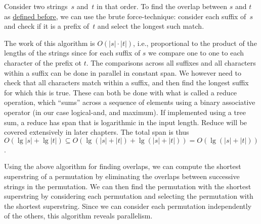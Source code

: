 \begin{cluster}
\label{grp:alg:genome::finding-overlap}

\begin{algorithm}
\label{alg:genome::finding-overlap}
Consider two strings~$s$ and~$t$ in that order.
To find the overlap between $s$ and $t$ as
\href{def:genome::prob::overlap}{defined before},
 we can use the brute force-technique:
consider each suffix of~$s$ and check if it is a prefix of~$t$ and
select the longest such match.


The work of this algorithm is $O(|s| \cdot |t|)$, i.e., proportional to the product of
the lengths of the strings since for each suffix of $s$ we compare one to
one to each character of the prefix ot $t$.
The comparisons across all suffixes and all characters within a suffix can be done in parallel
in constant span.
We however need to check that all characters match within a suffix, and then find the longest suffix for
which this is true.    These can both be done with what is called a reduce operation, which 
``sums'' across a sequence of elements using a binary associative operator (in our case logical-and, and maximum).
If implemented using a tree sum, a reduce has span that is logarithmic in the input length.   Reduce will be covered
extensively in later chapters.
The total span is thus $O(\lg{|s|} + \lg{|t|}) \subseteq
O(\lg{(|s|+|t|)} + \lg{(|s|+|t|)}) = O(\lg{(|s|+|t|)})$.

\end{algorithm}
\end{cluster}

\begin{cluster}
\label{grp:alg:genome::finding-the-shortest-permutation}

\begin{algorithm}
\label{alg:genome::finding-the-shortest-permutation}
Using the above algorithm for finding overlaps, we can compute the
shortest superstring of a permutation by eliminating the overlaps
between successive strings in the permutation.
We can then find the permutation with the shortest superstring by
considering each permutation and selecting the permutation with the
shortest superstring.
Since we can consider each permutation independently of the others,
this algorithm reveals parallelism.

\end{algorithm}
\end{cluster}

